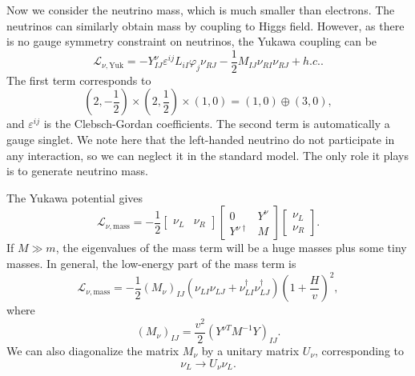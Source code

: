 Now we consider the neutrino mass, which is much smaller than electrons.
The neutrinos can similarly obtain mass by coupling to Higgs field.
However, as there is no gauge symmetry constraint on neutrinos, the Yukawa coupling can be
\begin{equation}
	\mathcal L_{\nu,\mathrm{Yuk}} = - Y^\nu_{IJ} \varepsilon^{ij} L_{iI} \varphi_j \nu_{RJ} - \frac{1}{2} M_{IJ} \nu_{RI} \nu_{RJ} + h.c..
\end{equation}
The first term corresponds to
\begin{equation}
	\left(2, -\frac{1}{2}\right) \times \left(2, \frac{1}{2}\right) \times \left(1, 0\right) = \left(1,0\right) \oplus(3,0),
\end{equation}
and $\varepsilon^{ij}$ is the Clebsch-Gordan coefficients.
The second term is automatically a gauge singlet.
We note here that the left-handed neutrino do not participate in any interaction, so we can neglect it in the standard model.
The only role it plays is to generate neutrino mass.

The Yukawa potential gives
\begin{equation}
	\mathcal L_{\nu,\mathrm{mass}} = -\frac{1}{2}
	\begin{bmatrix}
		\nu_L & \nu_R
	\end{bmatrix} 
	\begin{bmatrix}
		0 & Y^\nu \\ Y^{\nu\dagger} & M
	\end{bmatrix} 
	\begin{bmatrix}
		\nu_L \\ \nu_R
	\end{bmatrix}.
\end{equation}
If $M \gg m$, the eigenvalues of the mass term will be a huge masses plus some tiny masses.
In general, the low-energy part of the mass term is
\begin{equation}
	\mathcal L_{\nu,\mathrm{mass}} = -\frac{1}{2} (M_\nu)_{IJ} \left(\nu_{LI} \nu_{LJ} + \nu_{LI}^\dagger \nu_{LJ}^\dagger\right)\left(1+\frac{H}{v}\right)^2,
\end{equation}
where
\begin{equation}
	(M_\nu)_{IJ} = \frac{v^2}{2} \left(Y^{\nu T} M^{-1} Y \right)_{IJ}.
\end{equation}
We can also diagonalize the matrix $M_\nu$ by a unitary matrix $U_\nu$, corresponding to
\begin{equation}
	\nu_L \rightarrow U_\nu \nu_L.
\end{equation}

